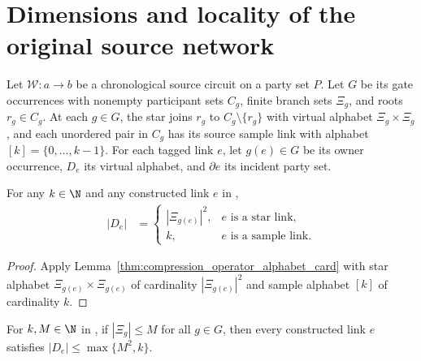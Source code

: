 \section{Dimensions and locality of the original source network}
\label{sec:peps_source_network_dimensions}

Let $\mathcal W:a\to b$ be a chronological source circuit on a party set $P$.
Let $G$ be its gate occurrences with nonempty participant sets $C_g$, finite
branch sets $\Xi_g$, and roots $r_g\in C_g$. At each $g\in G$, the star joins
$r_g$ to $C_g\setminus\{r_g\}$ with virtual alphabet $\Xi_g\times\Xi_g$, and
each unordered pair in $C_g$ has its source sample link with alphabet
$[k]=\{0,\ldots,k-1\}$. For each tagged link $e$, let $g(e)\in G$ be its owner
occurrence, $D_e$ its virtual alphabet, and $\partial e$ its incident party set.

\begin{lemma}
    \label{thm:peps_source_density_link_card}
    \leanok
    For any $k\in\N$ and any constructed link $e$ in
    \cite[proof of Theorem~5.2]{OpenAI2026PolynomialPEPS},
    \begin{align}
        |D_e| & =
        \begin{cases}
            |\Xi_{g(e)}|^2, & e\text{ is a star link},   \\
            k,              & e\text{ is a sample link}.
        \end{cases}
        \label{eq:peps_source_density_link_card}
    \end{align}
\end{lemma}

\begin{proof}
    \leanok
    Apply Lemma~\ref{thm:compression_operator_alphabet_card} with star
    alphabet $\Xi_{g(e)}\times\Xi_{g(e)}$ of cardinality $|\Xi_{g(e)}|^2$ and
    sample alphabet $[k]$ of cardinality $k$.
\end{proof}

\begin{lemma}
    \label{thm:peps_source_density_link_card_bound}
    \leanok
    For $k,M\in\N$ in \cite[proof of Theorem~5.2]{OpenAI2026PolynomialPEPS}, if
    $|\Xi_g|\le M$ for all $g\in G$, then every constructed link $e$ satisfies
    $|D_e|\le\max\{M^2,k\}$.
\end{lemma}

